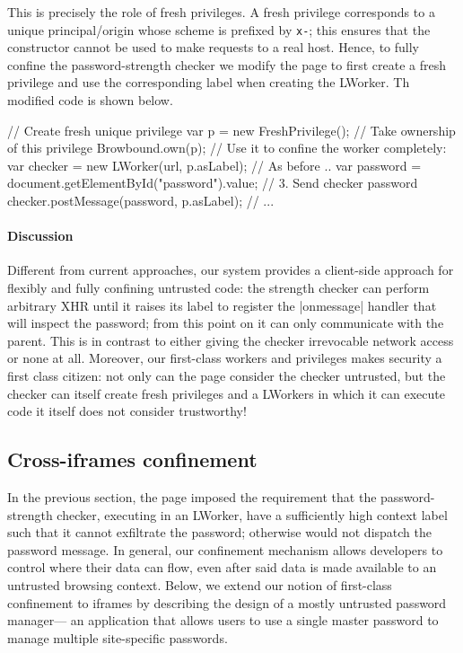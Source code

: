This is precisely the role of fresh privileges.
%
A fresh privilege corresponds to a unique principal/origin whose
scheme is prefixed by \texttt{x-}; this ensures that the \xhr{}
constructor cannot be used to make requests to a real host.
%
Hence, to fully confine the password-strength checker we modify the
 page to first create a fresh privilege and use the
corresponding label when creating the LWorker.
%
Th modified code is shown below.
\begin{jscode}
// Create fresh unique privilege
var p = new FreshPrivilege();
// Take ownership of this privilege
Browbound.own(p);
// Use it to confine the worker completely:
var checker = new LWorker(url, p.asLabel);
// As before ..
var password = 
 document.getElementById("password").value;
// 3. Send checker password 
checker.postMessage(password, p.asLabel);
// ...
\end{jscode}

\paragraph{Discussion}
Different from current approaches, our system provides a client-side
approach for flexibly and fully confining untrusted code:
%
the strength checker can perform arbitrary XHR until it raises its
label to register the \js|onmessage| handler that will inspect the
password; from this point on it can only communicate with the parent.
%
This is in contrast to either giving the checker irrevocable network
access or none at all.
%
Moreover, our first-class workers and privileges makes security a
first class citizen: not only can the page consider the checker
untrusted, but the checker can itself create fresh privileges and a
LWorkers in which it can execute code it itself does not consider
trustworthy!

\subsection{Cross-iframes confinement}
\label{sec:system:iframe}

In the previous section, the  page imposed the
requirement that the password-strength checker, executing in an
LWorker, have a sufficiently high context label such that it cannot
exfiltrate the password; otherwise \sys{} would not dispatch the
password message.
%
In general, our confinement mechanism allows developers to control
where their data can flow, even after said data is made available to
an untrusted browsing context.
%
Below, we extend our notion of first-class confinement to iframes by
describing the design of a mostly untrusted password manager--- an
application that allows users to use a single master password to
manage multiple site-specific passwords.

